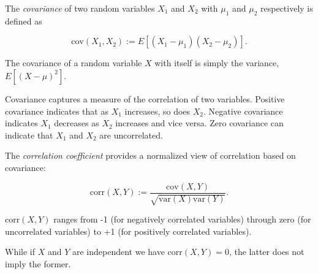 \documentclass[12pt]{article}
\newcommand{\var}{\mathrm{var}}
\newcommand{\cov}{\mathrm{cov}}
\newcommand{\corr}{\mathrm{corr}}
\newcommand{\defined}{:=}
\begin{document}

The \emph{covariance} of two random variables $X_1$ and $X_2$ with  $\mu_1$ and $\mu_2$ respectively is defined as

\begin{equation}
\cov(X_1,X_2) \defined E[(X_1 - \mu_1)(X_2 - \mu_2)].
\end{equation}

The covariance of a random variable $X$ with itself is simply the variance, $E[(X - \mu)^2]$.

Covariance captures a measure of the correlation of two variables.  Positive covariance indicates that as $X_1$ increases, so does $X_2$.  Negative covariance indicates $X_1$ decreases as $X_2$ increases and vice versa.  Zero covariance can indicate that $X_1$ and $X_2$ are uncorrelated.

The \emph{correlation coefficient} provides a normalized view of correlation based on covariance:

\begin{equation}
\corr(X,Y) \defined \frac{\cov(X,Y)}{\sqrt{\var(X)\var(Y)}}.
\end{equation}

$\corr(X,Y)$ ranges from -1 (for negatively correlated variables) through zero (for uncorrelated variables) to +1 (for positively correlated variables).

While if $X$ and $Y$ are independent we have $\corr(X,Y)=0$, the latter does not imply the former.
\end{document}
